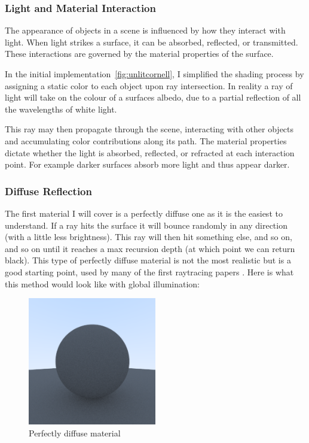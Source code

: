\documentclass[12pt]{article}
\begin{document}
\subsubsection{Light and Material Interaction}
The appearance of objects in a scene is influenced by how they interact with light. When light strikes a surface, it can be absorbed, reflected, or transmitted. These interactions are governed by the material properties of the surface.

In the initial implementation~\ref{fig:unlitcornell}, I simplified the shading process by assigning a static color to each object upon ray intersection. In reality a ray of light will take on the colour of a surfaces albedo, due to a partial reflection of all the wavelengths of white light.

This ray may then propagate through the scene, interacting with other objects and accumulating color contributions along its path. The material properties dictate whether the light is absorbed, reflected, or refracted at each interaction point. For example darker surfaces absorb more light and thus appear darker.

\subsubsection{Diffuse Reflection}
The first material I will cover is a perfectly diffuse one as it is the easiest to understand. If a ray hits the surface it will bounce randomly in any direction (with a little less brightness). This ray will then hit something else, and so on, and so on until it reaches a max recursion depth (at which point we can return black). This type of perfectly diffuse material is not the most realistic but is a good starting point, used by many of the first raytracing papers \cite{Whitted1980}. Here is what this method would look like with global illumination:

\begin{figure}[H]
    \centering
    \includegraphics[width=0.5\textwidth]{images/lambertian/uniform_diffuse.png}
    \caption{Perfectly diffuse material}
    \label{fig:perfdiffmat}
\end{figure}
\end{document}
